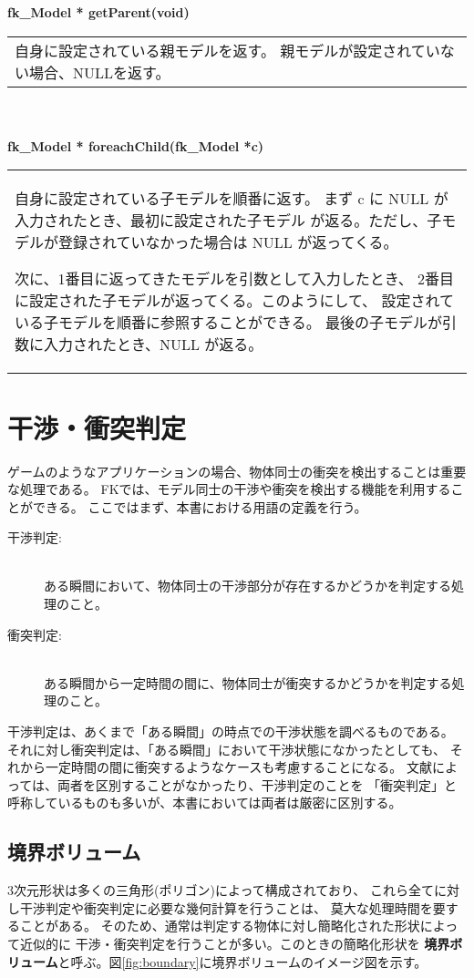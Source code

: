 \begin{tabbing}
\> \textbf{fk\_Model * getParent(void)} \\
	\> \> \begin{tabular}{p{15cm}}
		自身に設定されている親モデルを返す。
		親モデルが設定されていない場合、NULLを返す。
	\end{tabular} \\ \\

\> \textbf{fk\_Model * foreachChild(fk\_Model *c)} \\
	\> \> \begin{tabular}{p{15cm}}
		自身に設定されている子モデルを順番に返す。
		まず c に NULL が入力されたとき、最初に設定された子モデル
		が返る。ただし、子モデルが登録されていなかった場合は
		NULL が返ってくる。

		次に、1番目に返ってきたモデルを引数として入力したとき、
		2番目に設定された子モデルが返ってくる。このようにして、
		設定されている子モデルを順番に参照することができる。
		最後の子モデルが引数に入力されたとき、NULL が返る。
	\end{tabular}
\end{tabbing}

\section{干渉・衝突判定}
ゲームのようなアプリケーションの場合、物体同士の衝突を検出することは重要な処理である。
FKでは、モデル同士の干渉や衝突を検出する機能を利用することができる。
ここではまず、本書における用語の定義を行う。
\begin{description}
 \item[干渉判定:] ~ \\
	ある瞬間において、物体同士の干渉部分が存在するかどうかを判定する処理のこと。

 \item[衝突判定:] ~ \\
	ある瞬間から一定時間の間に、物体同士が衝突するかどうかを判定する処理のこと。
\end{description}

干渉判定は、あくまで「ある瞬間」の時点での干渉状態を調べるものである。
それに対し衝突判定は、「ある瞬間」において干渉状態になかったとしても、
それから一定時間の間に衝突するようなケースも考慮することになる。
文献によっては、両者を区別することがなかったり、干渉判定のことを
「衝突判定」と呼称しているものも多いが、本書においては両者は厳密に区別する。

\subsection{境界ボリューム}
3次元形状は多くの三角形(ポリゴン)によって構成されており、
これら全てに対し干渉判定や衝突判定に必要な幾何計算を行うことは、
莫大な処理時間を要することがある。
そのため、通常は判定する物体に対し簡略化された形状によって近似的に
干渉・衝突判定を行うことが多い。このときの簡略化形状を
\textbf{境界ボリューム}と呼ぶ。図\ref{fig:boundary}に境界ボリュームのイメージ図を示す。

